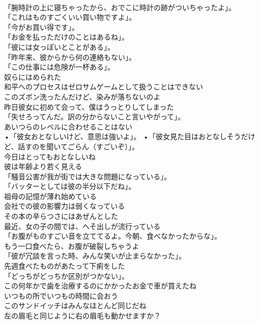 \documentclass[8pt]{extreport}
\begin{document}
\begin{CJK}{UTF8}{min}
\\	「腕時計の上に寝ちゃったから、おでこに時計の跡がついちゃったよ」。	
\\	「これはものすごくいい買い物ですよ」。	
\\	「今がお買い得です」。	
\\	「お金を払っただけのことはあるね」。	
\\	「彼には女っぽいとことがある」。	
\\	「昨年来、彼からから何の連絡もない」。	
\\	「この仕事には危険が一杯ある」。	
\\	奴らにはめられた	
\\	和平へのプロセスはゼロサムゲームとして扱うことはできない	
\\	このズボン洗ったんだけど、染みが落ちないのよ	
\\	昨日彼女に初めて会って、僕はうっとりしてしまった	
\\	「失せろってんだ。訳の分からないこと言いやがって」。	
\\	あいつらのレベルに合わせることはない	
\\	•「彼女おとなしいけど、意思は強いよ」。 •「彼女見た目はおとなしそうだけど、話すのを聞いてごらん（すごいぞ）」。	
\\	今日はとってもおとなしいね	
\\	彼は年齢より若く見える	
\\	「騒音公害が我が街では大きな問題になっている」。	
\\	「バッターとしては彼の半分以下だね」。	
\\	祖母の記憶が薄れ始めている	
\\	会社での彼の影響力は弱くなっている	
\\	その本の辛らつさにはあぜんとした	
\\	最近、女の子の間では、へそ出しが流行っている	
\\	「お腹がものすごい音を立ててるよ。今朝、食べなかったからな」。	
\\	もう一口食べたら、お腹が破裂しちゃうよ	
\\	「彼が冗談を言った時、みんな笑いが止まらなかった」。	
\\	先週食べたものがあたって下痢をした	
\\	「どっちがどっちか区別がつかない」。	
\\	この何年かで歯を治療するのにかかったお金で車が買えたね	
\\	いつもの所でいつもの時間に会おう	
\\	このサンドイッチはみんなほとんど同じだね	
\\	左の眉毛と同じように右の眉毛も動かせますか？	

\end{CJK}
\end{document}
